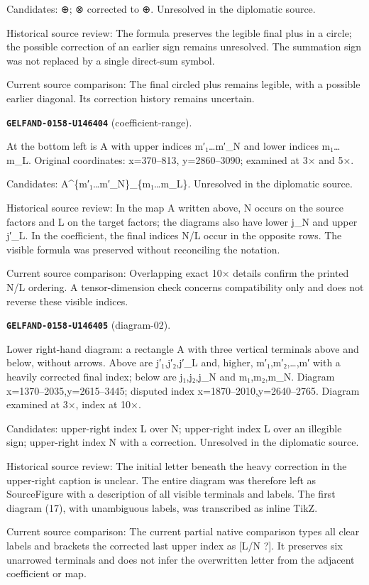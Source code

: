 Candidates: ⊕; ⊗ corrected to ⊕. Unresolved in the diplomatic source.\par
Historical source review: The formula preserves the legible final plus in a circle; the possible correction of an earlier sign remains unresolved. The summation sign was not replaced by a single direct-sum symbol.\par
Current source comparison: The final circled plus remains legible, with a possible earlier diagonal. Its correction history remains uncertain.\par\medskip
\par\noindent\leavevmode{}\label{GELFAND-0158-U146404}\label{GELFAND-P001464:coefficient-range}\textbf{\texttt{GELFAND-0158-U146404}} (coefficient-range).\nopagebreak[4]\par
At the bottom left is A with upper indices m′₁…m′\_N and lower indices m₁…m\_L. Original coordinates: x=370–813, y=2860–3090; examined at 3× and 5×.\par
Candidates: A\textasciicircum{}\{m′₁…m′\_N\}\_\{m₁…m\_L\}. Unresolved in the diplomatic source.\par
Historical source review: In the map A written above, N occurs on the source factors and L on the target factors; the diagrams also have lower j\_N and upper j′\_L. In the coefficient, the final indices N/L occur in the opposite rows. The visible formula was preserved without reconciling the notation.\par
Current source comparison: Overlapping exact 10× details confirm the printed N/L ordering. A tensor-dimension check concerns compatibility only and does not reverse these visible indices.\par\medskip
\par\noindent\leavevmode{}\label{GELFAND-0158-U146405}\label{GELFAND-P001464:diagram-02}\textbf{\texttt{GELFAND-0158-U146405}} (diagram-02).\nopagebreak[4]\par
Lower right-hand diagram: a rectangle A with three vertical terminals above and below, without arrows. Above are j′₁,j′₂,j′\_L and, higher, m′₁,m′₂,…,m′ with a heavily corrected final index; below are j₁,j₂,j\_N and m₁,m₂,m\_N. Diagram x=1370–2035,y=2615–3445; disputed index x=1870–2010,y=2640–2765. Diagram examined at 3×, index at 10×.\par
Candidates: upper-right index L over N; upper-right index L over an illegible sign; upper-right index N with a correction. Unresolved in the diplomatic source.\par
Historical source review: The initial letter beneath the heavy correction in the upper-right caption is unclear. The entire diagram was therefore left as SourceFigure with a description of all visible terminals and labels. The first diagram (17), with unambiguous labels, was transcribed as inline TikZ.\par
Current source comparison: The current partial native comparison types all clear labels and brackets the corrected last upper index as [L/N ?]. It preserves six unarrowed terminals and does not infer the overwritten letter from the adjacent coefficient or map.\par\medskip
